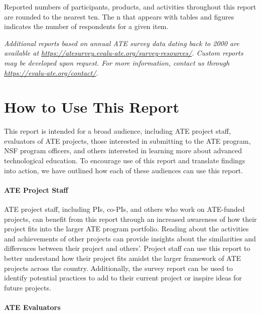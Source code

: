 \documentclass[
]{report}
\begin{document}
Reported numbers of participants, products, and activities throughout this report are rounded to the nearest ten. The n that appears with tables and figures indicates the number of respondents for a given item.

\emph{Additional reports based on annual ATE survey data dating back to 2000 are available at \url{https://atesurvey.evalu-ate.org/survey-resources/}. Custom reports may be developed upon request. For more information, contact us through \url{https://evalu-ate.org/contact/}.}

\hypertarget{how-to-use-this-report}{%
\chapter*{How to Use This Report}\label{how-to-use-this-report}}

This report is intended for a broad audience, including ATE project staff, evaluators of ATE projects, those interested in submitting to the ATE program, NSF program officers, and others interested in learning more about advanced technological education. To encourage use of this report and translate findings into action, we have outlined how each of these audiences can use this report.

\hypertarget{ate-project-staff}{%
\subsubsection{ATE Project Staff}\label{ate-project-staff}}

ATE project staff, including PIs, co-PIs, and others who work on ATE-funded projects, can benefit from this report through an increased awareness of how their project fits into the larger ATE program portfolio. Reading about the activities and achievements of other projects can provide insights about the similarities and differences between their project and others'. Project staff can use this report to better understand how their project fits amidst the larger framework of ATE projects across the country. Additionally, the survey report can be used to identify potential practices to add to their current project or inspire ideas for future projects.

\hypertarget{ate-evaluators}{%
\subsubsection{ATE Evaluators}\label{ate-evaluators}}
\end{document}
